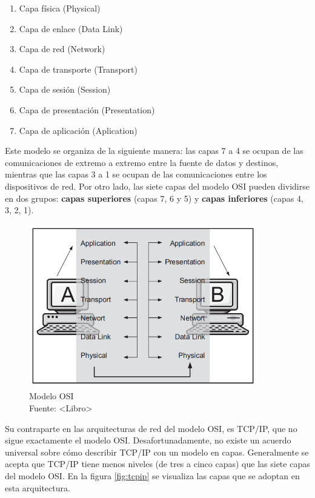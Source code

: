 \begin{enumerate}
    \item Capa física (Physical)
    \item Capa de enlace (Data Link)
    \item Capa de red (Network)
    \item Capa de transporte (Transport)
    \item Capa de sesión (Session)
    \item Capa de presentación (Presentation)
    \item Capa de aplicación (Aplication)
\end{enumerate}

Este modelo se organiza de la siguiente manera: las capas 7 a 4 se ocupan de las comunicaciones de extremo a extremo entre la fuente de datos y destinos, mientras que las capas 3 a 1 se ocupan de las comunicaciones entre los dispositivos de red. Por otro lado, las siete capas del modelo OSI pueden dividirse en dos grupos: \textbf{capas superiores} (capas 7, 6 y 5) y \textbf{capas inferiores} (capas 4, 3, 2, 1).\\

\begin{figure}[H]
    \begin{center}
        \includegraphics[width=10cm]{img/capitulo_2/capas.png}
    \end{center}
    \caption{Modelo OSI\\Fuente: <Libro>}
    \label{fig:osi}
\end{figure}

Su contraparte en las arquitecturas de red del modelo OSI, es TCP/IP, que no sigue exactamente el modelo OSI. Desafortunadamente, no existe un acuerdo universal sobre cómo describir TCP/IP con un modelo en capas. Generalmente se acepta que TCP/IP tiene menos niveles (de tres a cinco capas) que las siete capas del modelo OSI. En la figura \ref{fig:tcpip} se visualiza las capas que se adoptan en esta arquitectura. 

